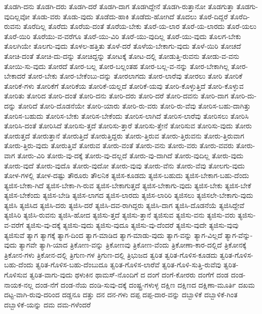 {ತೊಡಗಿ-ದನು
ತೊಡಗಿ-ದರು
ತೊಡಗಿ-ದರೆ
ತೊಡಗಿ-ದಾಗ
ತೊಡಗಿದ್ದೇನೆ
ತೊಡಗಿ-ರುತ್ತಾನೋ
ತೊಡಗುತ್ತಾ
ತೊಡಗು-ವುದಿಲ್ಲವೋ
ತೊಡು-ವರು
ತೊಡು-ವುದು
ತೊಡೆದು-ಹಾಕಿ
ತೊಡೆದು-ಹೋಗಿದೆ
ತೊದಲು
ತೊರೆ-ದಿದ್ದರೆ
ತೊರೆದಿ-ರುವನು
ತೊರೆದಿಲ್ಲ
ತೊರೆದು
ತೊರೆಯ-ದಂತೆ
ತೊರೆಯ-ಬೇಕು
ತೊರೆ-ಯ-ಲಾರ
ತೊರೆ-ಯ-ಲಾರದು
ತೊರೆ-ಯಲು
ತೊರೆ-ಯಿರಿ
ತೊರೆಯು-ವ-ವರೆಗೂ
ತೊರೆ-ಯು-ವಿರಿ
ತೊರೆ-ಯು-ವುದಿಲ್ಲ
ತೊರೆ-ಯು-ವುದು
ತೊಲಗ-ಬೇಕು
ತೊಲಗಿಯೇ
ತೊಲಗು-ವುದು
ತೊಳಲ-ಹತ್ತಿತು
ತೊಳೆ-ದರೆ
ತೊಳೆಯ-ಬೇಕಾಗು-ವುದು
ತೊಳೆ-ಯಿರಿ
ತೋಚದೆ
ತೋಚಿ-ದಂತೆ
ತೋಚಿ-ದು-ದನ್ನು
ತೋಚಿದ್ದನ್ನು
ತೋಟಕ್ಕೆ
ತೋಟ-ದಲ್ಲಿ
ತೋಡುತ್ತಿ-ರುವನು
ತೋಡು-ವ-ವನು
ತೋಯಿ-ಸು-ವುದು
ತೋರದೆ
ತೋರ-ಬಲ್ಲ
ತೋರ-ಬಲ್ಲಂತಹ
ತೋರ-ಬಲ್ಲ-ವ-ನನ್ನು
ತೋರ-ಬೇಕಾಗಿಲ್ಲ
ತೋರ-ಬೇಕಾದರೆ
ತೋರ-ಬೇಕು
ತೋರ-ಬೇಕೆಂಬು-ದನ್ನು
ತೋರಲಾಗದು
ತೋರ-ಲಾರೆವು
ತೋರಲು
ತೋರಿ
ತೋರಿಕೆ
ತೋರಿಕೆ-ಗಳು
ತೋರಿಕೆಗೆ
ತೋರಿಕೆಯ
ತೋರಿಕೆ-ಯಲ್ಲದೆ
ತೋರಿಕೆ-ಯವು
ತೋರಿ-ಕೊಳ್ಳುತ್ತಿದೆ
ತೋರಿ-ಕೊಳ್ಳುವ
ತೋರಿತು
ತೋರಿದ
ತೋರಿ-ದಂತೆ
ತೋರಿ-ದನು
ತೋರಿ-ದರು
ತೋರಿ-ದರೆ
ತೋರಿ-ದವನು
ತೋರಿ-ದಾಗ
ತೋರಿ-ದು-ದನ್ನು
ತೋರಿದೆ
ತೋರಿ-ದೊಡನೆಯೇ
ತೋರಿ-ಯಾರು
ತೋರಿ-ರು-ವರು
ತೋರಿ-ರು-ವೆವು
ತೋರಿಸ-ಬಹು-ದಾಗಿತ್ತು
ತೋರಿಸ-ಬಹುದು
ತೋರಿಸ-ಬೇಕು
ತೋರಿಸ-ಬೇಕೆಂದು
ತೋರಿಸ-ಲಾಗಿದೆ
ತೋರಿಸ-ಲಾರೆವು
ತೋರಿಸಲು
ತೋರಿಸಿ
ತೋರಿಸಿ-ದಂತೆ
ತೋರಿಸಿದೆ
ತೋರಿಸು-ತ್ತದೆ
ತೋರಿಸು-ತ್ತಾರೆ
ತೋರಿಸು-ತ್ತೇನೆ
ತೋರಿಸುವ
ತೋರಿಸು-ವುದು
ತೋರು
ತೋರುತ್ತದೆ
ತೋರುತ್ತಾನೆ
ತೋರುತ್ತಿದೆ
ತೋರುತ್ತಿದ್ದರು
ತೋರು-ತ್ತಿರುವ
ತೋರು-ತ್ತಿರುವನು
ತೋರು-ತ್ತಿರುವಾಗ
ತೋರು-ತ್ತಿರು-ವುದು
ತೋರುತ್ತಿವೆ
ತೋರುವ
ತೋರು-ವಂತೆ
ತೋರು-ವನು
ತೋರು-ವರು
ತೋರು-ವವರು
ತೋರು-ವಾಗ
ತೋರು-ವಿರಿ
ತೋರು-ವು-ದಕ್ಕೆ
ತೋರು-ವು-ದಲ್ಲದೆ
ತೋರು-ವು-ದಾಗಿದೆ
ತೋರು-ವುದಿಲ್ಲ
ತೋರು-ವುದು
ತೋರು-ವುದೆ
ತೋರು-ವುದೊ
ತೋರು-ವುದೋ
ತೋರು-ವುವು
ತೋರು-ವೆನು
ತೋರು-ವೆವು
ತೋಲಗು-ವುದು
ತೋಳ-ಗಳಲ್ಲಿ
ತೋಳ-ದಷ್ಟು
ತೌರೂರು
ತೌಲನಿಕ
ತ್ಯಜಿಸ-ಕೂಡದು
ತ್ಯಜಿಸ-ಬಹುದು
ತ್ಯಜಿಸ-ಬೇಕಾಗ-ಬಹು-ದೆಂದು
ತ್ಯಜಿಸ-ಬೇಕಾ-ಗಿದೆ
ತ್ಯಜಿಸ-ಬೇಕಾ-ಗಿ-ರುವ
ತ್ಯಜಿಸ-ಬೇಕಾಗುತ್ತದೆ
ತ್ಯಜಿಸ-ಬೇಕಾಗು-ವುದು
ತ್ಯಜಿಸ-ಬೇಕು
ತ್ಯಜಿಸ-ಬೇಕೆ
ತ್ಯಜಿಸ-ಬೇಕೆಂದು
ತ್ಯಜಿಸ-ಬೇಡಿ
ತ್ಯಜಿಸ-ಲಾಗದ
ತ್ಯಜಿಸ-ಲಾರದು
ತ್ಯಜಿಸ-ಲಾರಿರಿ
ತ್ಯಜಿಸಲು
ತ್ಯಜಿಸಲೇ-ಬೇಕಾಗು-ವುದು
ತ್ಯಜಿಸಿ
ತ್ಯಜಿಸಿದ
ತ್ಯಜಿಸಿ-ದರು
ತ್ಯಜಿಸಿ-ದರೆ
ತ್ಯಜಿಸಿ-ದವ-ರಾಗಿದ್ದರು
ತ್ಯಜಿಸಿ-ದಾಗ
ತ್ಯಜಿಸಿ-ದೊಡನೆಯೆ
ತ್ಯಜಿಸಿದ್ದೇವೆ
ತ್ಯಜಿಸಿರಿ
ತ್ಯಜಿಸಿ-ರುವನು
ತ್ಯಜಿಸಿ-ಹೋದ
ತ್ಯಜಿಸು-ತ್ತದೆ
ತ್ಯಜಿಸು-ತ್ತಾನೆ
ತ್ಯಜಿಸುವ
ತ್ಯಜಿಸು-ವನು
ತ್ಯಜಿಸು-ವರು
ತ್ಯಜಿಸು-ವ-ವರೆಗೆ
ತ್ಯಜಿಸು-ವು-ದಕ್ಕೆ
ತ್ಯಜಿಸು-ವುದು
ತ್ಯಜಿಸು-ವುದೂ
ತ್ಯಜಿಸು-ವು-ದೆಂದರೆ
ತ್ಯಜಿಸು-ವುದೇ
ತ್ಯಜಿಸು-ವುವು
ತ್ಯಜಿಸುವೆ
ತ್ಯಾಗ
ತ್ಯಾಗಕ್ಕೆ
ತ್ಯಾಗ-ದಿಂದ
ತ್ಯಾಗ-ಮಾಡಿದ
ತ್ಯಾಗ-ಮಾಡು-ವುದು
ತ್ಯಾಗ-ವನ್ನು
ತ್ಯಾಗ-ವಿಲ್ಲದೆ
ತ್ಯಾಗ-ವೆನ್ನು-ವುದು
ತ್ಯಾಗವೇ
ತ್ಯಾಗಿ-ಯಾದ
ತ್ರಿಕೋಣ-ವನ್ನು
ತ್ರಿಕೋಣವು
ತ್ರಿಕೋಣ-ವೆಂದು
ತ್ರಿಕೋಣಾ-ಕಾರ-ದಲ್ಲಿದೆ
ತ್ರಿಕೋನಕ್ಕೆ
ತ್ರಿಕೋನ-ಗಳು
ತ್ರಿಕೋನ-ದಲ್ಲಿ
ತ್ರಿಗುಣ-ಗಳ
ತ್ರಿಗುಣ-ದಲ್ಲಿ
ತ್ರಿಭುಜದ
ತ್ವರಿತ
ತ್ವರಿತ-ಗೊಳಿಸ-ಕೂಡದು
ತ್ವರಿತ-ಗೊಳಿಸ-ಬಹು-ದೆಂದು
ತ್ವರಿತ-ಗೊಳಿಸ-ಬಹು-ದೆಂಬುದೂ
ತ್ವರಿತ-ಗೊಳಿಸ-ಲಾರೆವೆ
ತ್ವರಿತ-ಗೊಳಿ-ಸುತ್ತಿ-ರುವೆವು
ತ್ವರಿತ-ಗೊಳಿಸುವ
ತ್ವರಿತ-ವಾಗು-ವುದು
ಥಳುಕಿನ
ಥಾಮಸ್-ನೊಂದಿಗೆ
ದ
ದಂಗೆ
ದಂಗೆ-ಕೋರರು
ದಂಗೆಗೆ
ದಂಡ
ದಂಡ-ನಾಯಕ-ನಲ್ಲ
ದಂಡ-ನೆಗೆ
ದಂಡ-ನೆಯ
ದಂಡಿ-ಸುವು-ದಕ್ಕೆ
ದಂಷ್ಟ್ರ-ಗಳುಳ್ಳ
ದಕ್ಷಿಣ
ದಕ್ಷಿಣದ
ದಕ್ಷಿಣಾ-ಮೂರ್ತಿ
ದಖಮ
ದಟ್ಟ-ವಾಗಿ-ರುವು-ದರಿಂದ
ದಡ್ಡನೂ
ದತ್ತು
ದನ
ದನ-ಗಳು
ದಪ್ಪ
ದಪ್ಪ-ದಾರ-ವನ್ನು
ದಬ್ಬಾಳಿಕೆ
ದಬ್ಬಾಳಿಕೆ-ಗಿಂತ
ದಬ್ಬಾಳಿಕೆ-ಯನ್ನು
ದಮ
ದಮ-ಗಳೆಂದರೆ
}
